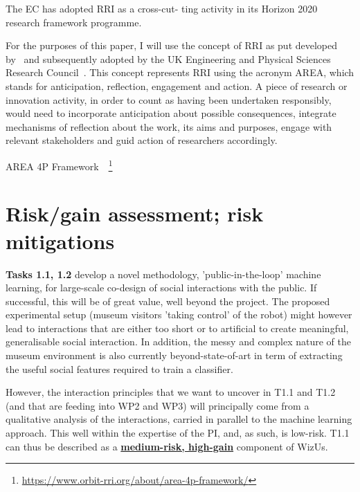 \documentclass[11pt,a4paper]{report}
\newcommand{\project}{WizUs\xspace}
\begin{document}
The EC has adopted RRI as a cross-cut-
ting activity in its Horizon 2020 research framework programme.

For the purposes of this paper, I will use the concept of RRI as put developed
by~\cite{stilgoe2013developing} and subsequently adopted by the UK Engineering
and Physical Sciences Research Council~\cite{owen2014uk}. This concept
represents RRI using the acronym AREA, which stands for anticipation,
reflection, engagement and action. A piece of research or innovation activity,
in order to count as having been undertaken responsibly, would need to
incorporate anticipation about possible consequences, integrate mechanisms of
reflection about the work, its aims and purposes, engage with relevant
stakeholders and guid action of researchers accordingly.

AREA 4P
Framework~\cite{stahl2018implementing}~\footnote{\url{https://www.orbit-rri.org/about/area-4p-framework/}}


\newpage
\section{Risk/gain assessment; risk mitigations}\label{risks}

\textbf{Tasks 1.1, 1.2} develop a novel methodology, 'public-in-the-loop' machine
learning, for large-scale co-design of social interactions with the public. If
successful, this will be of great value, well beyond the project. The
proposed experimental setup (museum visitors 'taking control' of the robot)
might however lead to interactions that are either too short or to artificial to
create meaningful, generalisable social interaction. In addition, the messy and
complex nature of the museum environment is also currently beyond-state-of-art
in term of extracting the useful social features required to train a classifier.

However, the interaction principles that we want to uncover in T1.1 and T1.2
(and that are feeding into WP2 and WP3) will principally come from a qualitative
analysis of the interactions, carried in parallel to the machine learning
approach. This well within the expertise of the PI, and, as such, is low-risk.
T1.1 can thus be described as a \ul{\bf medium-risk, high-gain} component of
\project.
\end{document}
